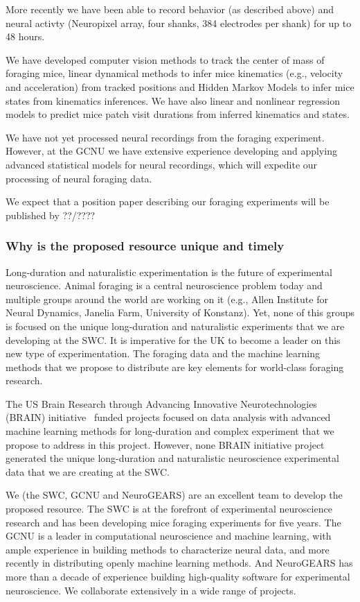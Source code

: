 More recently we have been able to record behavior (as described above) and
neural activty (Neuropixel array, four shanks, 384 electrodes per shank) for up
to 48 hours.

We have developed computer vision methods to track the center of mass of
foraging mice, linear dynamical methods to infer mice kinematics (e.g.,
velocity and acceleration) from tracked positions and Hidden Markov Models to
infer mice states from kinematics inferences.
%
We have also linear and nonlinear regression models to predict mice patch
visit durations from inferred kinematics and states.

We have not yet processed neural recordings from the foraging experiment.
However, at the GCNU we have extensive experience developing and applying
advanced statistical models for neural recordings, which will expedite our
processing of neural foraging data.

We expect that a position paper describing our foraging experiments will be
published by ??/????

\subsubsection*{Why is the proposed resource unique and timely}


Long-duration and naturalistic experimentation is the future of experimental
neuroscience.  Animal foraging is a central neuroscience problem today and
multiple groups around the world are working on it (e.g., Allen Institute for
Neural Dynamics, Janelia Farm, University of Konstanz). Yet, none of this
groups is focused on the unique long-duration and naturalistic experiments that
we are developing at the SWC. It is imperative for the UK to become a leader on
this new type of experimentation. The foraging data and the machine learning
methods that we propose to distribute are key elements for world-class foraging
research.

The US Brain Research through Advancing Innovative Neurotechnologies (BRAIN)
initiative~\citep{jorgensonEtAl15} funded projects focused on data analysis
with advanced machine learning methods for long-duration and complex experiment
that we propose to address in this project. However, none BRAIN initiative
project generated the unique long-duration and naturalistic neuroscience
experimental data that we are creating at the SWC.

We (the SWC, GCNU and NeuroGEARS) are an excellent team to develop the proposed
resource. The SWC is at the forefront of experimental neuroscience research and
has been developing mice foraging experiments for five years. The GCNU is a
leader in computational neuroscience and machine learning, with ample
experience in building methods to characterize neural data, and more recently
in distributing openly machine learning methods. And NeuroGEARS has more than a
decade of experience building high-quality software for experimental
neuroscience. We collaborate extensively in a wide range of projects.

